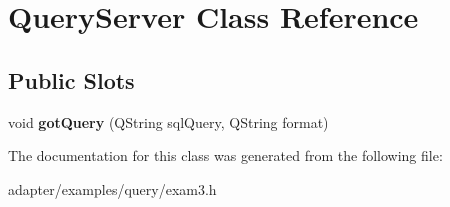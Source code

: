 \hypertarget{classQueryServer}{
\section{QueryServer Class Reference}
\label{classQueryServer}
}
\subsection*{Public Slots}
\begin{DoxyCompactItemize}
\item 
\hypertarget{classQueryServer_aa3ee87750f7d7effc64c9798ba1ddebd}{
void {\bfseries gotQuery} (QString sqlQuery, QString format)}
\label{classQueryServer_aa3ee87750f7d7effc64c9798ba1ddebd}

\end{DoxyCompactItemize}


The documentation for this class was generated from the following file:\begin{DoxyCompactItemize}
\item 
adapter/examples/query/exam3.h\end{DoxyCompactItemize}
